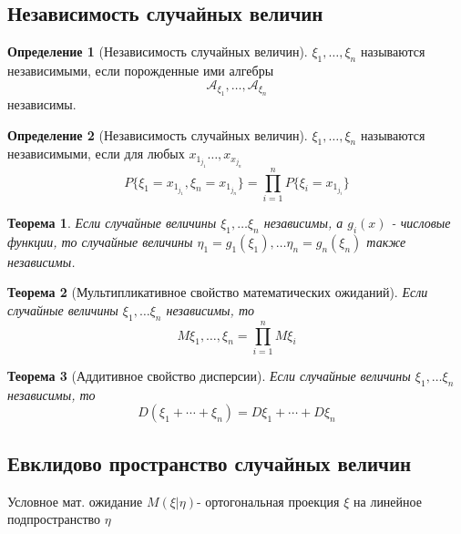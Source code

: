 \documentclass[a4paper]{article}
\newtheorem{theorem}{Теорема}[section]
\theoremstyle{definition}
\newtheorem*{definition}{Определение}
\theoremstyle{remark}
\begin{document}
\subsection{Независимость случайных величин}
\begin{definition}[Независимость случайных величин]
    $\xi_1, \dots, \xi_n$ называются независимыми, если порожденные ими алгебры \[\mathcal{A}_{\xi_1}, \dots, \mathcal{A}_{\xi_n}\] независимы.
\end{definition}
\begin{definition}[Независимость случайных величин]
    $\xi_1, \dots, \xi_n$ называются независимыми, если для любых $x_{1_{j_1}}\dots, x_{x_{j_n}}$
    \[P\{\xi_1 = x_{1_{j_1}}, \xi_n = x_{1_{j_n}}\} = \prod_{i = 1}^n P\{\xi_i = x_{1_{j_i}}\}\]
\end{definition}
\begin{theorem}
    Если случайные величины \(\xi_1, \dots \xi_n\) независимы, а \(g_i(x)\) - числовые функции, то случайные величины \(\eta_1 = g_1(\xi_1), \dots \eta_n = g_n(\xi_n) \) также независимы.
\end{theorem}
\begin{theorem}[Мультипликативное свойство математических ожиданий]
    Если случайные величины \(\xi_1, \dots \xi_n\) независимы, то 
    \[M \xi_1, \dots, \xi_n = \prod_{i = 1}^n M \xi_i\]
\end{theorem}
\begin{theorem}[Аддитивное свойство дисперсии]
    Если случайные величины \(\xi_1, \dots \xi_n\) независимы, то 
    \[D(\xi_1 + \cdots + \xi_n) = D\xi_1 + \cdots + D\xi_n\]
\end{theorem}
\subsection{Евклидово пространство случайных величин}
Условное мат. ожидание $M (\xi | \eta)$- ортогональная проекция $\xi$ на линейное подпространство $\eta$
\end{document}
